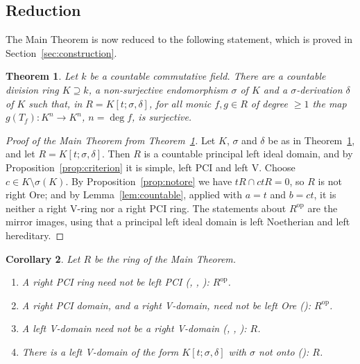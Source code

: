 \documentclass[11pt]{amsart}
\theoremstyle{plain}
\newtheorem{theorem}{Theorem}[section]
\newtheorem{corollary}[theorem]{Corollary}
\theoremstyle{definition}
\theoremstyle{remark}
\newcommand{\op}{\mathrm{op}}
\begin{document}
\subsection{Reduction}
The Main Theorem is now reduced to the following statement, which is proved in Section~\ref{sec:construction}.

\begin{theorem}\label{thm:target}
Let $k$ be a countable commutative field. There are a countable division ring $K\supseteq k$, a non-surjective endomorphism $\sigma$ of $K$ and a $\sigma$-derivation $\delta$ of $K$ such that, in $R=K[t;\sigma,\delta]$, for all monic $f,g\in R$ of degree $\ge1$ the map $g(T_f)\colon K^n\to K^n$, $n=\deg f$, is surjective.
\end{theorem}

\begin{proof}[Proof of the Main Theorem from Theorem~\ref{thm:target}]
Let $K$, $\sigma$ and $\delta$ be as in Theorem~\ref{thm:target}, and let $R=K[t;\sigma,\delta]$. Then $R$ is a countable principal left ideal domain, and by Proposition~\ref{prop:criterion} it is simple, left PCI and left V. Choose $c\in K\setminus\sigma(K)$. By Proposition~\ref{prop:notore} we have $tR\cap ctR=0$, so $R$ is not right Ore; and by Lemma~\ref{lem:countable}, applied with $a=t$ and $b=ct$, it is neither a right V-ring nor a right PCI ring. The statements about $R^{\op}$ are the mirror images, using that a principal left ideal domain is left Noetherian and left hereditary.
\end{proof}

\begin{corollary}\label{cor:answers}
Let $R$ be the ring of the Main Theorem.
\begin{enumerate}
\item A right PCI ring need not be left PCI \textup{(}\cite{Fai73}, \cite[\S7, (10)]{CF75}, \cite{Dam79}\textup{)}: $R^{\op}$.
\item A right PCI domain, and a right V-domain, need not be left Ore \textup{(}\cite[\S7, (7)]{CF75}\textup{)}: $R^{\op}$.
\item A left V-domain need not be a right V-domain \textup{(}\cite[\S7, (10)]{CF75}, \cite[\S1]{JLL09}, \cite[Remark~2.8]{BDV18}\textup{)}: $R$.
\item There is a left V-domain of the form $K[t;\sigma,\delta]$ with $\sigma$ not onto \textup{(}\cite[Remark~6.3]{JLL09}\textup{)}: $R$.
\end{enumerate}
\end{corollary}
\end{document}

